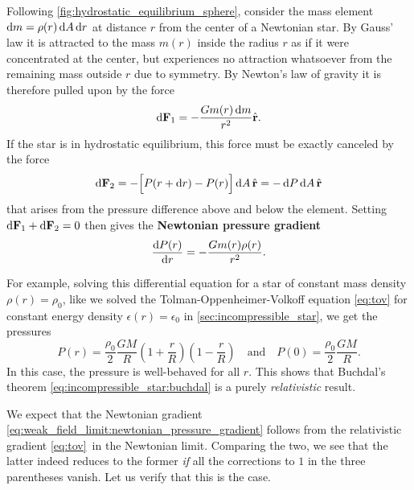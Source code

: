 Following \cref{fig:hydrostatic_equilibrium_sphere}, consider the mass element $\mathop{}\!\mathrm{d} m = \rho(r) \mathop{}\!\mathrm{d} A \mathop{}\!\mathrm{d} r$ at distance $r$ from the center of a Newtonian star.
By Gauss' law it is attracted to the mass $m(r)$ inside the radius $r$ as if it were concentrated at the center, but experiences no attraction whatsoever from the remaining mass outside $r$ due to symmetry.
By Newton's law of gravity it is therefore pulled upon by the force
\begin{equation}
	\mathop{}\!\mathrm{d} \mathbf{F}_1 = -\frac{G m(r) \mathop{}\!\mathrm{d} m}{r^2} \hat{\textbf{r}} .
	\label{eq:weak_field_limit:force_newton}
\end{equation}
If the star is in hydrostatic equilibrium, this force must be exactly canceled by the force
\begin{equation}
	\mathop{}\!\mathrm{d} \textbf{F}_2 = - \Big[ P(r + \mathop{}\!\mathrm{d} r) - P(r) \Big] \mathop{}\!\mathrm{d} A \, \hat{\textbf{r}} = -\mathop{}\!\mathrm{d} P \mathop{}\!\mathrm{d} A \, \hat{\textbf{r}}
	\label{eq:weak_field_limit:force_pressure}
\end{equation}
that arises from the pressure difference above and below the element.
Setting $\mathop{}\!\mathrm{d} \textbf{F}_1 + \mathop{}\!\mathrm{d} \textbf{F}_2 = 0$ then gives the \textbf{Newtonian pressure gradient}
\begin{equation}
	\odv{P(r)}{r} = -\frac{G m(r) \rho(r)}{r^2} .
	\label{eq:weak_field_limit:newtonian_pressure_gradient}
\end{equation}

For example, solving this differential equation for a star of constant mass density $\rho(r) = \rho_0$, like we solved the Tolman-Oppenheimer-Volkoff equation \eqref{eq:tov} for constant energy density $\epsilon(r) = \epsilon_0$ in \cref{sec:incompressible_star}, we get the pressures
\begin{equation}
	P(r) = \frac{\rho_0}{2} \frac{G M}{R} \left( 1 + \frac{r}{R} \right) \left( 1 - \frac{r}{R} \right)
	\quad \text{and} \quad
	P(0) = \frac{\rho_0}{2} \frac{GM}{R} .
	\label{eq:weak_field_limit:newtonian_pressure}
\end{equation}
In this case, the pressure is well-behaved for all $r$.
This shows that Buchdal's theorem \eqref{eq:incompressible_star:buchdal} is a purely \emph{relativistic} result.


We expect that the Newtonian gradient \eqref{eq:weak_field_limit:newtonian_pressure_gradient} follows from the relativistic gradient \eqref{eq:tov} in the Newtonian limit.
Comparing the two, we see that the latter indeed reduces to the former \emph{if} all the corrections to $1$ in the three parentheses vanish.
Let us verify that this is the case.

